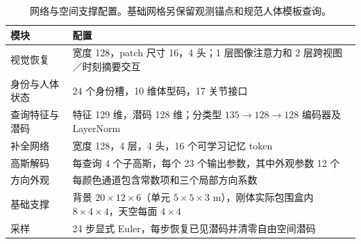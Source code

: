 \begin{table}[H]
\centering\small
\caption{网络与空间支撑配置。基础网格另保留观测锚点和规范人体模板查询。}
\label{tab:network-config}
\begin{tabular}{@{}lp{}@{}}
\toprule
模块 & 配置 \\
\midrule
视觉恢复 & 宽度 128，patch 尺寸 16，4 头；1 层图像注意力和 2 层跨视图／时刻摘要交互 \\
身份与人体状态 & 24 个身份槽，10 维体型码，17 关节接口 \\
查询特征与潜码 & 特征 129 维，潜码 128 维；分类型 $135\rightarrow128\rightarrow128$ 编码器及 LayerNorm \\
补全网络 & 宽度 128，4 层，4 头，16 个可学习记忆 token \\
高斯解码 & 每查询 4 个子高斯，每个 23 个输出参数，其中外观参数 12 个 \\
方向外观 & 每颜色通道包含常数项和三个局部方向系数 \\
基础支撑 & 背景 $20\times12\times6$（单元 $5\times5\times3$ m），刚体实际包围盒内 $8\times4\times4$，天空每面 $4\times4$ \\
采样 & 24 步显式 Euler，每步恢复已见潜码并清零自由空间潜码 \\
\bottomrule
\end{tabular}
\end{table}
